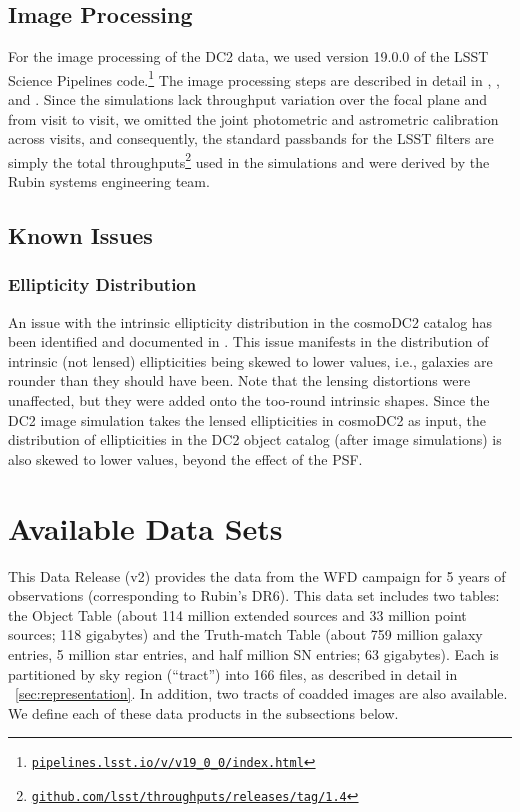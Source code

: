 \documentclass[modern]{descnote}
\newcommand*{\https}[1]{\href{https://#1}{\nolinkurl{#1}}}
\newcommand*{\thisversion}{v2}
\begin{document}
\subsection{Image Processing}
\label{sec:processing}
For the image processing of the DC2 data, we used version 19.0.0 of the LSST Science Pipelines code.\footnote{\https{pipelines.lsst.io/v/v19_0_0/index.html}}  The image processing steps are described in detail in \cite{2020arXiv201005926L}, \cite{10.1093/pasj/psx080}, and \cite{2018arXiv181203248B}.   Since the simulations lack throughput variation over the focal plane and from visit to visit, we omitted the joint photometric and astrometric calibration across visits, and consequently, the standard passbands for the LSST filters are simply the total throughputs\footnote{\https{github.com/lsst/throughputs/releases/tag/1.4}} used in the simulations and were derived by the Rubin systems engineering team.

\subsection{Known Issues}

\subsubsection{Ellipticity Distribution}

An issue with the intrinsic ellipticity distribution in the cosmoDC2 catalog has been identified and documented in \cite{Kovacs:2022:6336066}. This issue manifests in the distribution of intrinsic (not lensed) ellipticities being skewed to lower values, i.e., galaxies are rounder than they should have been. 
Note that the lensing distortions were unaffected, but they were added onto the too-round intrinsic shapes. Since the DC2 image simulation takes the lensed ellipticities in cosmoDC2 as input, the distribution of ellipticities in the DC2 object catalog (after image simulations) is also skewed to lower values, beyond the effect of the PSF. 


\section{Available Data Sets}
\label{sec:products}

This Data Release (\thisversion{}) provides the data from the WFD campaign for 5 years of observations (corresponding to Rubin's DR6). This data set includes two tables: the Object Table (about 114 million extended sources and 33 million point sources; 118 gigabytes) and the Truth-match Table (about 759 million galaxy entries, 5 million star entries, and half million SN entries; 63 gigabytes). Each is partitioned by sky region (``tract'') into 166 files, as described in detail in ~\autoref{sec:representation}. In addition, two tracts of coadded images are also available. We define each of these data products in the subsections below. 
\end{document}
